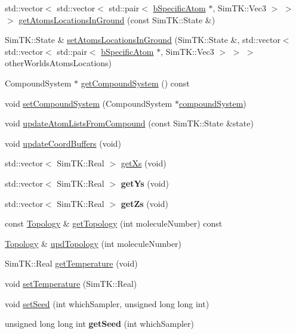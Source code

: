 \begin{DoxyCompactItemize}
\item 
std\+::vector$<$ std\+::vector$<$ std\+::pair$<$ \hyperlink{classbSpecificAtom}{b\+Specific\+Atom} $\ast$, Sim\+T\+K\+::\+Vec3 $>$ $>$ $>$ \hyperlink{classWorld_a4b642cb465b7f7e144045351eef3ff60}{get\+Atoms\+Locations\+In\+Ground} (const Sim\+T\+K\+::\+State \&)
\item 
Sim\+T\+K\+::\+State \& \hyperlink{classWorld_ac7f0377e169f07e614ac664f1b0937c2}{set\+Atoms\+Locations\+In\+Ground} (Sim\+T\+K\+::\+State \&, std\+::vector$<$ std\+::vector$<$ std\+::pair$<$ \hyperlink{classbSpecificAtom}{b\+Specific\+Atom} $\ast$, Sim\+T\+K\+::\+Vec3 $>$ $>$ $>$ other\+Worlds\+Atoms\+Locations)
\item 
Compound\+System $\ast$ \hyperlink{classWorld_a94e5791e5b951a2087bbf995bf4aeff9}{get\+Compound\+System} () const 
\item 
void \hyperlink{classWorld_af4eaaaf451cd2cdceb490012fd7886b4}{set\+Compound\+System} (Compound\+System $\ast$\hyperlink{classWorld_a63269bd638b21445a78de794c97ee592}{compound\+System})
\item 
void \hyperlink{classWorld_a6e702362f7fd93376e76fc07256bdac7}{update\+Atom\+Lists\+From\+Compound} (const Sim\+T\+K\+::\+State \&state)
\item 
void \hyperlink{classWorld_ad3a225d5cdbb616866557a7dfa47f5a9}{update\+Coord\+Buffers} (void)
\item 
std\+::vector$<$ Sim\+T\+K\+::\+Real $>$ \hyperlink{classWorld_aa8b3082bb20557b070fad5dff6417d07}{get\+Xs} (void)
\item 
std\+::vector$<$ Sim\+T\+K\+::\+Real $>$ {\bfseries get\+Ys} (void)\hypertarget{classWorld_a6bf83fa6b3343cc65671122514671a89}{}\label{classWorld_a6bf83fa6b3343cc65671122514671a89}

\item 
std\+::vector$<$ Sim\+T\+K\+::\+Real $>$ {\bfseries get\+Zs} (void)\hypertarget{classWorld_a2969bfb385f741cd29046a310bae5df8}{}\label{classWorld_a2969bfb385f741cd29046a310bae5df8}

\item 
const \hyperlink{classTopology}{Topology} \& \hyperlink{classWorld_a32e376d68e307d97c2ecb6728b15bfc7}{get\+Topology} (int molecule\+Number) const 
\item 
\hyperlink{classTopology}{Topology} \& \hyperlink{classWorld_a18eded7d9547d0409f9595f2faafa16a}{upd\+Topology} (int molecule\+Number)
\item 
Sim\+T\+K\+::\+Real \hyperlink{classWorld_a6166532b83968e6fb2a428cecb93bc7e}{get\+Temperature} (void)
\item 
void \hyperlink{classWorld_a8fbd26bdd06cde3b45827ab06de4d792}{set\+Temperature} (Sim\+T\+K\+::\+Real)
\item 
void \hyperlink{classWorld_a2be6866ca33c4d8251d3f4421e1cd69a}{set\+Seed} (int which\+Sampler, unsigned long long int)
\item 
unsigned long long int {\bfseries get\+Seed} (int which\+Sampler)\hypertarget{classWorld_a138dca3b00502309aead4c2e1ce51703}{}\label{classWorld_a138dca3b00502309aead4c2e1ce51703}


\end{DoxyCompactItemize}
